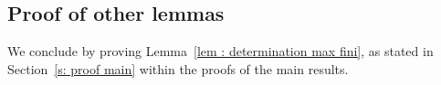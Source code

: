 \documentclass[a4paper, 11pt]{article}
\theoremstyle{definition}
\begin{document}
{%
%
%
%

\subsection{Proof of other lemmas}
We conclude by proving Lemma~\ref{lem : determination max fini}, as stated in Section~\ref{s: proof main} within the proofs of the main results.

}
\end{document}
